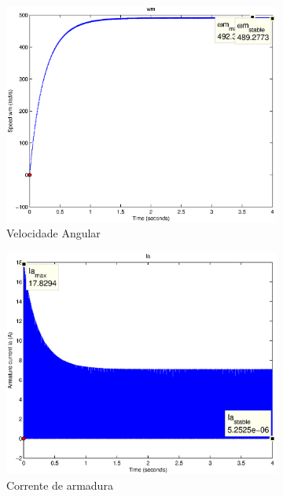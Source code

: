 \documentclass{article}
\begin{document}
\begin{figure}[H]
	\centering
	\begin{subfigure}[b]{0.49\linewidth}
		\includegraphics[width=\linewidth]{matlab/wm5}
		\caption{Velocidade Angular}
	\end{subfigure}
	\begin{subfigure}[b]{0.49\linewidth}
		\centering
		\includegraphics[width=\linewidth]{matlab/ia5}
		\caption{Corrente de armadura}
	\end{subfigure}
	\begin{subfigure}[b]{0.49\linewidth}
		\centering

\end{subfigure}
\end{figure}
\end{document}
